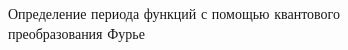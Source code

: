 \begin{figure}
\centering



\caption{ Определение периода функций с помощью квантового
  преобразования Фурье}
\label{figQuantCompQuantPeriodFinding}
\end{figure}
